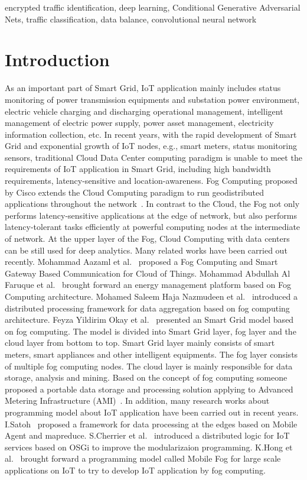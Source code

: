 \documentclass[conference]{IEEEtran}
\begin{document}
\begin{IEEEkeywords}
encrypted traffic identification, deep learning, Conditional Generative Adversarial Nets, traffic classification, data balance, convolutional neural network
\end{IEEEkeywords}


\section{Introduction}\label{sec:intro} %
As an important part of Smart Grid, IoT application mainly includes status monitoring of power transmission equipments and substation power environment, electric vehicle charging and discharging operational management, intelligent management of electric power supply, power asset management, electricity information collection, etc. In recent years, with the rapid development of Smart Grid and exponential growth of IoT nodes, e.g., smart meters, status monitoring sensors, traditional Cloud Data Center computing paradigm is unable to meet the requirements of IoT application in Smart Grid, including high bandwidth requirements, latency-sensitive and location-awareness. Fog Computing proposed by Cisco extends the Cloud Computing paradigm to run geodistributed applications throughout the network~\cite{bonomi2012}. In contrast to the Cloud, the Fog not only performs latency-sensitive applications at the edge of
network, but also performs latency-tolerant tasks efficiently at
powerful computing nodes at the intermediate of network. At
the upper layer of the Fog, Cloud Computing with data centers can be
still used for deep analytics.
Many related works have been carried out recently. Mohammad Aazaml et al.~\cite{Aazam2014gateway} proposed a Fog Computing and Smart Gateway Based Communication for Cloud of Things.   Mohammad Abdullah Al Faruque et al.~\cite{Faruque2016energy} brought forward an energy management platform based on Fog Computing architecture. Mohamed Saleem Haja Nazmudeen et al.~\cite{Nazmudeen2016PLC} introduced a distributed processing framework for data aggregation based on fog computing architecture. Feyza Yildirim Okay et al.~\cite{Okay2016smartgrid} presented an Smart Grid model based on fog computing. The model is divided into Smart  Grid layer, fog layer and the cloud layer from bottom to top. Smart Grid layer mainly consists of smart meters, smart appliances and other intelligent equipments. The fog layer consists of multiple fog computing nodes. The cloud layer is mainly responsible for data storage, analysis and mining. Based on the concept of fog computing someone proposed a portable data storage and processing solution applying to Advanced Metering Infrastructure (AMI)~\cite{Yan2016AMI}. In addition, many research works about programming model about IoT application have been carried out in recent years. I.Satoh~\cite{Satoh2013} proposed a framework for data processing at the edges based on Mobile Agent and mapreduce. S.Cherrier et al.~\cite{Cherrier2011} introduced a distributed logic for IoT services based on OSGi to improve the modularizaion programming. K.Hong et al.~\cite{Hong2013} brought forward a programming model called Mobile Fog for large scale applications on IoT to try to develop IoT application by fog computing.
\end{document}
